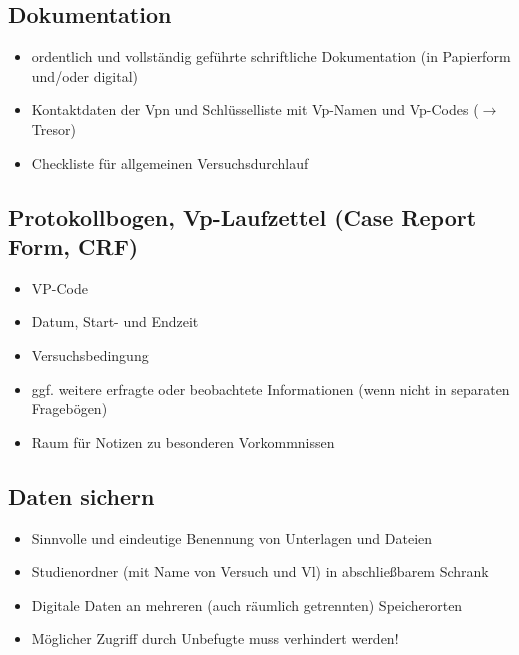 \documentclass[
]{book}
\begin{document}
\hypertarget{dokumentation}{%
\subsection{Dokumentation}\label{dokumentation}}

\begin{itemize}
\item
  ordentlich und vollständig geführte schriftliche Dokumentation (in Papierform und/oder digital)
\item
  Kontaktdaten der Vpn und Schlüsselliste mit Vp-Namen und Vp-Codes (\(\rightarrow\) Tresor)
\item
  Checkliste für allgemeinen Versuchsdurchlauf
\end{itemize}

\hypertarget{protokollbogen-vp-laufzettel-case-report-form-crf}{%
\subsection{Protokollbogen, Vp-Laufzettel (Case Report Form, CRF)}\label{protokollbogen-vp-laufzettel-case-report-form-crf}}

\begin{itemize}
\item
  VP-Code
\item
  Datum, Start- und Endzeit
\item
  Versuchsbedingung
\item
  ggf. weitere erfragte oder beobachtete Informationen (wenn nicht in separaten Fragebögen)
\item
  Raum für Notizen zu besonderen Vorkommnissen
\end{itemize}

\hypertarget{daten-sichern}{%
\subsection{Daten sichern}\label{daten-sichern}}

\begin{itemize}
\item
  Sinnvolle und eindeutige Benennung von Unterlagen und Dateien
\item
  Studienordner (mit Name von Versuch und Vl) in abschließbarem Schrank
\item
  Digitale Daten an mehreren (auch räumlich getrennten) Speicherorten
\item
  Möglicher Zugriff durch Unbefugte muss verhindert werden!
\end{itemize}

  
\end{document}
